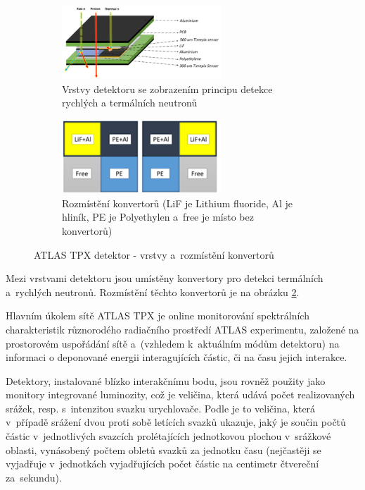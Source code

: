 \begin{figure}[th]
	\begin{center}
		\begin{subfigure}{6cm}
			\includegraphics[width=6cm]{figures/tpx_lay.png}	
			\caption{Vrstvy detektoru se zobrazením principu detekce rychlých a termálních neutronů}
			\label{fig:tpx_detector_layers}
		\end{subfigure}
		\hspace{0.5cm}
		\begin{subfigure}{6cm}
			\includegraphics[width=6cm]{figures/tpx_conv.png}
			\caption{Rozmístění konvertorů (LiF je Lithium fluoride, Al je hliník, PE je Polyethylen a~free je místo bez konvertorů)}
			\label{fig:tpx_detector_convertors}
		\end{subfigure}
		\caption{ATLAS TPX detektor - vrstvy a~rozmístění konvertorů}
		\label{fig:tpx_detector}
	\end{center}			
\end{figure}

Mezi vrstvami detektoru jsou umístěny konvertory pro detekci termálních a~rychlých neutronů. Rozmístění těchto konvertorů je na obrázku \ref{fig:tpx_detector_convertors}.

Hlavním úkolem sítě ATLAS TPX je online monitorování spektrálních charakteristik různorodého radiačního prostředí ATLAS experimentu, založené na prostorovém uspořádání sítě a~(vzhledem k~aktuálním módům detektoru) na informaci o deponované energii interagujících částic, či na času jejich interakce. 

Detektory, instalované blízko interakčnímu bodu, jsou rovněž použity jako monitory integrované luminozity, což je veličina, která udává počet realizovaných srážek, resp. s~intenzitou svazku urychlovače. Podle \cite{wagner:o_lhc} je to veličina, která v~případě srážení dvou proti sobě letících svazků ukazuje, jaký je součin počtů částic v~jednotlivých svazcích prolétajících jednotkovou plochou v~srážkové oblasti, vynásobený počtem obletů svazků za jednotku času (nejčastěji se vyjadřuje v~jednotkách vyjadřujících počet částic na centimetr čtvereční za~sekundu).

